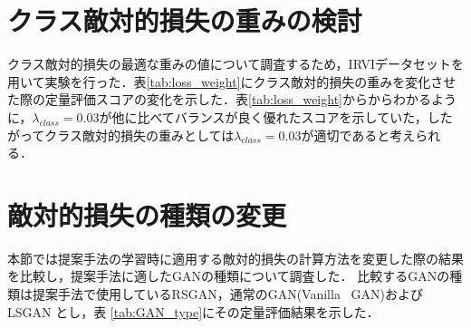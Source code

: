 \documentclass[11pt,dvipdfmx]{ujreport}
\begin{document}
\section{クラス敵対的損失の重みの検討}
クラス敵対的損失の最適な重みの値について調査するため，IRVIデータセットを用いて実験を行った．表\ref{tab:loss_weight}にクラス敵対的損失の重みを変化させた際の定量評価スコアの変化を示した．表\ref{tab:loss_weight}からからわかるように，$\lambda_{class}=0.03$が他に比べてバランスが良く優れたスコアを示していた，したがってクラス敵対的損失の重みとしては$\lambda_{class}=0.03$が適切であると考えられる．

\begin{table}[tb]
\centering
\caption{クラス敵対的損失の重みによる定量評価スコアの変化}
\label{tab:loss_weight}
\end{table}


\section{敵対的損失の種類の変更}
本節では提案手法の学習時に適用する敵対的損失の計算方法を変更した際の結果を比較し，提案手法に適したGANの種類について調査した． 比較するGANの種類は提案手法で使用しているRSGAN\cite{Jolicoeur_2018_arXiv_RelativisticGAN}，通常のGAN(Vanilla \ GAN)\cite{Goodfellow_2014_NIPS_GAN}およびLSGAN \cite{Mao_2016_CVPR_LSGAN}とし，表 \ref{tab:GAN_type}にその定量評価結果を示した．\par
\end{document}
